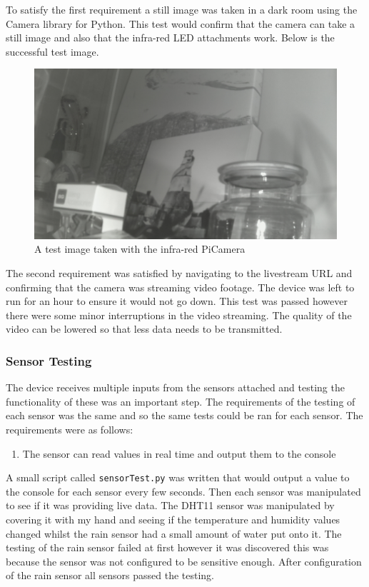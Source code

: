 \documentclass[10pt,a4paper]{article}
\begin{document}
To satisfy the first requirement a still image was taken in a dark room using the Camera library for Python. This test would confirm that the camera can take a still image and also that the infra-red LED attachments work. Below is the successful test image. 

\begin{figure}[H]
  \centering
    \includegraphics[width=\linewidth]{images/testimage.jpg}
    \caption{A test image taken with the infra-red PiCamera}
    \label{fig:cameraTest}
\end{figure}

The second requirement was satisfied by navigating to the livestream URL and confirming that the camera was streaming video footage. The device was left to run for an hour to ensure it would not go down. This test was passed however there were some minor interruptions in the video streaming. The quality of the video can be lowered so that less data needs to be transmitted. 

\subsubsection{Sensor Testing}
The device receives multiple inputs from the sensors attached and testing the functionality of these was an important step. The requirements of the testing of each sensor was the same and so the same tests could be ran for each sensor. The requirements were as follows:
\begin{enumerate}
  \item The sensor can read values in real time and output them to the console
\end{enumerate}

A small script called \texttt{sensorTest.py} was written that would output a value to the console for each sensor every few seconds. Then each sensor was manipulated to see if it was providing live data. The DHT11 sensor was manipulated by covering it with my hand and seeing if the temperature and humidity values changed whilst the rain sensor had a small amount of water put onto it. The testing of the rain sensor failed at first however it was discovered this was because the sensor was not configured to be sensitive enough. After configuration of the rain sensor all sensors passed the testing. 
\end{document}
